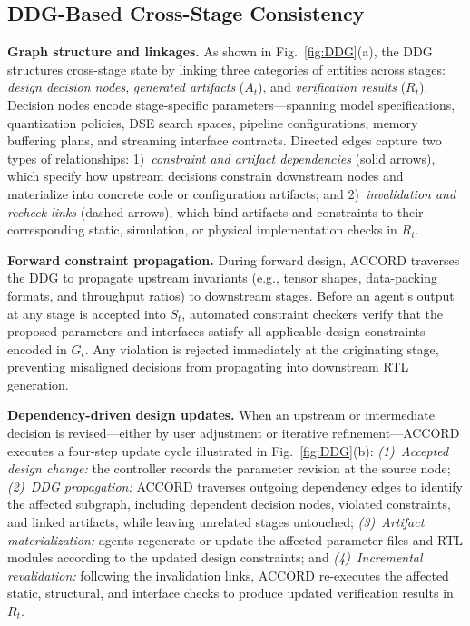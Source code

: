 \documentclass[9pt,conference]{IEEEtran}
\begin{document}
\subsection{DDG-Based Cross-Stage Consistency}
\textbf{Graph structure and linkages.}
As shown in Fig.~\ref{fig:DDG}(a), the DDG structures cross-stage state by linking three categories of entities across stages: \emph{design decision nodes}, \emph{generated artifacts} ($A_t$), and \emph{verification results} ($R_t$). Decision nodes encode stage-specific parameters—spanning model specifications, quantization policies, DSE search spaces, pipeline configurations, memory buffering plans, and streaming interface contracts. Directed edges capture two types of relationships: 
1)~\emph{constraint and artifact dependencies} (solid arrows), which specify how upstream decisions constrain downstream nodes and materialize into concrete code or configuration artifacts; and 
2)~\emph{invalidation and recheck links} (dashed arrows), which bind artifacts and constraints to their corresponding static, simulation, or physical implementation checks in $R_t$.

\textbf{Forward constraint propagation.}
During forward design, ACCORD traverses the DDG to propagate upstream invariants (e.g., tensor shapes, data-packing formats, and throughput ratios) to downstream stages. Before an agent's output at any stage is accepted into $S_t$, automated constraint checkers verify that the proposed parameters and interfaces satisfy all applicable design constraints encoded in $G_t$. Any violation is rejected immediately at the originating stage, preventing misaligned decisions from propagating into downstream RTL generation.

\textbf{Dependency-driven design updates.}
When an upstream or intermediate decision is revised—either by user adjustment or iterative refinement—ACCORD executes a four-step update cycle illustrated in Fig.~\ref{fig:DDG}(b): 
\emph{(1)~Accepted design change:} the controller records the parameter revision at the source node; 
\emph{(2)~DDG propagation:} ACCORD traverses outgoing dependency edges to identify the affected subgraph, including dependent decision nodes, violated constraints, and linked artifacts, while leaving unrelated stages untouched; 
\emph{(3)~Artifact materialization:} agents regenerate or update the affected parameter files and RTL modules according to the updated design constraints; and 
\emph{(4)~Incremental revalidation:} following the invalidation links, ACCORD re-executes the affected static, structural, and interface checks to produce updated verification results in $R_t$.
\end{document}
